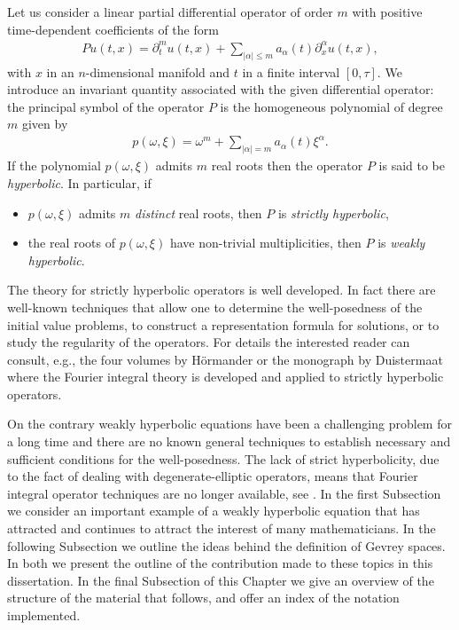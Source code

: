 \documentclass[12pt,oneside,a4paper]{book}
\numberwithin{equation}{section}     %
\theoremstyle{plain}
\theoremstyle{definition}
\begin{document}
Let us consider a linear partial differential operator of order $m$ with positive time-dependent coefficients of the form
\begin{align*}
Pu(t,x)=\partial_t^m u(t,x)+ \sum_{|\alpha|\leq m}a_\alpha(t)\partial_x^\alpha u(t,x), 
\end{align*}
with $x$ in an $n$-dimensional manifold and $t$ in a finite interval $[0,\tau]$. We introduce an invariant quantity associated with the given differential operator: the principal symbol of the operator $P$ is the homogeneous polynomial of degree $m$ given by
\begin{align*}
p(\omega,\xi)=\omega^m+\sum_{|\alpha|= m }a_\alpha(t)\xi^\alpha.
\end{align*}
If the polynomial $p(\omega,\xi)$ admits $m$ real roots then the operator $P$ is said to be \textit{hyperbolic}. In particular, if 
\begin{itemize}
	\item $p(\omega,\xi)$ admits $m$ \textit{distinct} real roots, then $P$ is \textit{strictly hyperbolic},
	\item the real roots of $p(\omega,\xi)$ have non-trivial multiplicities, then $P$ is \textit{weakly hyperbolic}.
\end{itemize} 
The theory for strictly hyperbolic operators is well developed. In fact there are well-known techniques that allow one to determine the well-posedness of the initial value problems, to construct a representation formula for solutions, or to study the regularity of the operators. For details the interested reader can consult, e.g., the four volumes by H\"ormander \cite{H1990} or the monograph by Duistermaat \cite{D1996} where the Fourier integral theory is developed and applied to strictly hyperbolic operators. 

On the contrary weakly hyperbolic equations have been a challenging problem for a long time and there are no known general techniques to establish necessary and sufficient conditions for the well-posedness. The lack of strict hyperbolicity, due to the fact of dealing with degenerate-elliptic operators, means that Fourier integral operator techniques are no longer available, see \cite{Muller-Stein:Lp-wave-Heis}.  In the first Subsection we consider an important example of a weakly hyperbolic equation that has attracted and continues to attract the interest of many mathematicians. In the following Subsection we outline the ideas behind the definition of Gevrey spaces. In both we present the outline of the contribution made to these topics in this dissertation. In the final Subsection of this Chapter we give an overview of the structure of the material that follows, and offer an index of the notation implemented.
\end{document}
